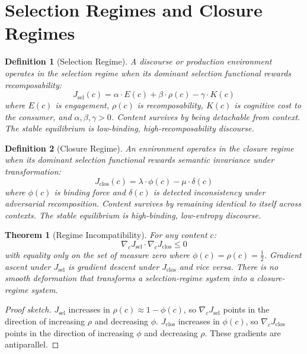 \documentclass[12pt]{article}
\newtheorem{theorem}{Theorem}[section]
\newtheorem{definition}{Definition}[section]
\newcommand{\bind}{\phi}
\newcommand{\recomp}{\rho}
\newcommand{\Jsel}{J_{\mathrm{sel}}}
\newcommand{\Jclos}{J_{\mathrm{clos}}}
\begin{document}
\section{Selection Regimes and Closure Regimes}
\label{sec:regimes}

\begin{definition}[Selection Regime]
\label{def:selreg}
A discourse or production environment operates in the \emph{selection regime}
when its dominant selection functional rewards recomposability:
\[
\Jsel(c) = \alpha \cdot E(c) + \beta \cdot \recomp(c) - \gamma \cdot K(c)
\]
where $E(c)$ is engagement, $\recomp(c)$ is recomposability, $K(c)$ is
cognitive cost to the consumer, and $\alpha, \beta, \gamma > 0$. Content
survives by being detachable from context. The stable equilibrium is
low-binding, high-recomposability discourse.
\end{definition}

\begin{definition}[Closure Regime]
\label{def:closreg}
An environment operates in the \emph{closure regime} when its dominant
selection functional rewards semantic invariance under transformation:
\[
\Jclos(c) = \lambda \cdot \bind(c) - \mu \cdot \delta(c)
\]
where $\bind(c)$ is binding force and $\delta(c)$ is detected inconsistency
under adversarial recomposition. Content survives by remaining identical to
itself across contexts. The stable equilibrium is high-binding, low-entropy
discourse.
\end{definition}

\begin{theorem}[Regime Incompatibility]
\label{thm:incompatibility}
For any content $c$:
\[
\nabla_c \Jsel \cdot \nabla_c \Jclos \leq 0
\]
with equality only on the set of measure zero where $\bind(c) = \recomp(c)
= \tfrac{1}{2}$. Gradient ascent under $\Jsel$ is gradient descent under
$\Jclos$ and vice versa. There is no smooth deformation that transforms a
selection-regime system into a closure-regime system.
\end{theorem}

\begin{proof}[Proof sketch]
$\Jsel$ increases in $\recomp(c) \approx 1 - \bind(c)$, so $\nabla_c \Jsel$
points in the direction of increasing $\recomp$ and decreasing $\bind$.
$\Jclos$ increases in $\bind(c)$, so $\nabla_c \Jclos$ points in the
direction of increasing $\bind$ and decreasing $\recomp$. These gradients
are antiparallel.
\end{proof}
\end{document}
